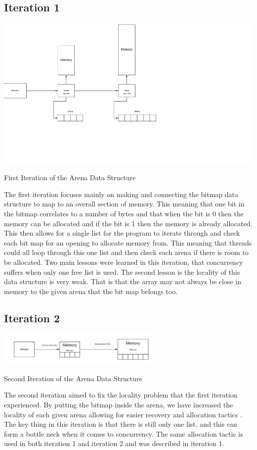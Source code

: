 \documentclass[conference]{IEEEtran}
\begin{document}
\subsection{Iteration 1}
\includegraphics[width=14cm]{iteration1datastructure.jpg}
\caption{First Iteration of the Arena Data Structure}
\label{fig1:Iteration1}
The first iteration focuses mainly on making and connecting the bitmap data structure to map to an overall section of memory. This meaning that one bit in the bitmap correlates to a number of bytes and that when the bit is 0 then the memory can be allocated and if the bit is 1 then the memory is already allocated. This then allows for a single list for the program to iterate through and check each bit map for an opening to allocate memory from. This meaning that threads could all loop through this one list and then check each arena if there is room to be allocated. Two main lessons were learned in this iteration, that concurrency suffers when only one free list is used. The second lesson is the locality of this data structure is very weak. That is that the array may not always be close in memory to the given arena that the bit map belongs too. 


\subsection{Iteration 2} 
\includegraphics[width=8cm]{Iteration2datastructure.jpg}
\caption{Second Iteration of the Arena Data Structure}
\label{fig2:Iteration2}
The second iteration aimed to fix the locality problem that the first iteration experienced. By putting the bitmap inside the arena, we have increased the locality of each given arena allowing for easier recovery and allocation tactics \cite{Chatzistergiou}. The key thing in this iteration is that there is still only one list, and this can form a bottle neck when it comes to concurrency. The same allocation tactic is used in both iteration 1 and iteration 2 and was described in iteration 1. 
\end{document}
